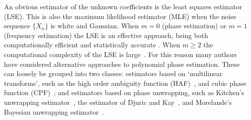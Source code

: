 \documentclass[journal]{IEEEtran}
\begin{document}
An obvious estimator of the unknown coefficients is the least squares estimator (LSE).  This is also the maximum likelihood estimator (MLE) when the noise sequence $\{X_n\}$ is white and Gaussian.  When $m=0$ (phase estimation) or $m=1$ (frequency estimation) the LSE is an effective approach, being both computationally efficient and statistically accurate \cite{Quinn2009_dasp_phase_only_information_loss,Hannan1973,Quinn2001,McKilliam_mean_dir_est_sq_arc_length2010,McKilliam2010thesis}. When $m \geq 2$ the computational complexity of the LSE is large~\cite{Oshea_cpf_2004,McKilliam2010thesis,Abatzoglou_ml_chirp_1986}. For this reason many authors have considered alternative approaches to polynomial phase estimation. These can loosely be grouped into two classes: estimators based on `multilinear transforms', such as the high order ambiguity function (HAF)~\cite{Peleg_DPT_1995,Peleg1991_est_class_PPS_1991,Porat_asympt_HAF_DPT_1996,Farquharson_another_poly_est_2005,Boashash_Oshea_1994,Barbarossa_analysis_of_PPS_1997}, and cubic phase function (CPF)~\cite{Oshea_cpf_2004,Oshea_cpf_2002_letter,Djurovic_haf_cpf_2012}; and estimators based on phase unwrapping, such as Kitchen's unwrapping estimator~\cite{Kitchen_polyphase_unwrapping_1994}, the estimator of Djuric and Kay~\cite{Djuric_phase_unwrap_chirp_1990}, and Morelande's Bayesian unwrapping estimator~\cite{Morelande_bayes_unwrapping_2009_tsp}.
\end{document}

